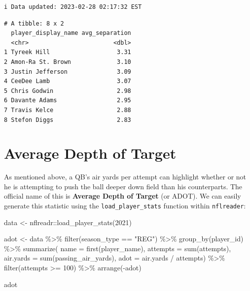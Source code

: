 \documentclass[
  letterpaper,
]{krantz}
\newenvironment{Shaded}{\begin{snugshade}}{\end{snugshade}}
\newcommand{\AttributeTok}[1]{\textcolor[rgb]{0.40,0.45,0.13}{#1}}
\newcommand{\DecValTok}[1]{\textcolor[rgb]{0.68,0.00,0.00}{#1}}
\newcommand{\FunctionTok}[1]{\textcolor[rgb]{0.28,0.35,0.67}{#1}}
\newcommand{\NormalTok}[1]{\textcolor[rgb]{0.00,0.23,0.31}{#1}}
\newcommand{\OtherTok}[1]{\textcolor[rgb]{0.00,0.23,0.31}{#1}}
\newcommand{\SpecialCharTok}[1]{\textcolor[rgb]{0.37,0.37,0.37}{#1}}
\newcommand{\StringTok}[1]{\textcolor[rgb]{0.13,0.47,0.30}{#1}}
\begin{document}
\begin{verbatim}
i Data updated: 2023-02-28 02:17:32 EST
\end{verbatim}

\begin{verbatim}
# A tibble: 8 x 2
  player_display_name avg_separation
  <chr>                        <dbl>
1 Tyreek Hill                   3.31
2 Amon-Ra St. Brown             3.10
3 Justin Jefferson              3.09
4 CeeDee Lamb                   3.07
5 Chris Godwin                  2.98
6 Davante Adams                 2.95
7 Travis Kelce                  2.88
8 Stefon Diggs                  2.83
\end{verbatim}

\hypertarget{average-depth-of-target}{%
\section{Average Depth of Target}\label{average-depth-of-target}}

As mentioned above, a QB's air yards per attempt can highlight whether
or not he is attempting to push the ball deeper down field than his
counterparts. The official name of this is \textbf{Average Depth of
Target} (or ADOT). We can easily generate this statistic using the
\texttt{load\_player\_stats} function within \texttt{nflreader}:

\begin{Shaded}
\begin{Highlighting}[]
\NormalTok{data }\OtherTok{\textless{}{-}}\NormalTok{ nflreadr}\SpecialCharTok{::}\FunctionTok{load\_player\_stats}\NormalTok{(}\DecValTok{2021}\NormalTok{)}

\NormalTok{adot }\OtherTok{\textless{}{-}}\NormalTok{ data }\SpecialCharTok{\%\textgreater{}\%}
  \FunctionTok{filter}\NormalTok{(season\_type }\SpecialCharTok{==} \StringTok{"REG"}\NormalTok{) }\SpecialCharTok{\%\textgreater{}\%}
  \FunctionTok{group\_by}\NormalTok{(player\_id) }\SpecialCharTok{\%\textgreater{}\%}
  \FunctionTok{summarize}\NormalTok{(}
    \AttributeTok{name =} \FunctionTok{first}\NormalTok{(player\_name),}
    \AttributeTok{attempts =} \FunctionTok{sum}\NormalTok{(attempts),}
    \AttributeTok{air.yards =} \FunctionTok{sum}\NormalTok{(passing\_air\_yards),}
    \AttributeTok{adot =}\NormalTok{ air.yards }\SpecialCharTok{/}\NormalTok{ attempts) }\SpecialCharTok{\%\textgreater{}\%}
  \FunctionTok{filter}\NormalTok{(attempts }\SpecialCharTok{\textgreater{}=} \DecValTok{100}\NormalTok{) }\SpecialCharTok{\%\textgreater{}\%}
  \FunctionTok{arrange}\NormalTok{(}\SpecialCharTok{{-}}\NormalTok{adot)}

\NormalTok{adot}
\end{Highlighting}
\end{Shaded}
\end{document}
